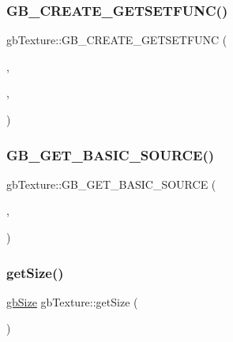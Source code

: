 \mbox{\label{classgb_texture_a0d3f3eb5103dc70d99d72483ce6aeea6}} 
\subsubsection{\texorpdfstring{GB\_CREATE\_GETSETFUNC()}{GB\_CREATE\_GETSETFUNC()}\hspace{0.1cm}{\footnotesize\ttfamily [3/3]}}
{\footnotesize\ttfamily gb\+Texture\+::\+G\+B\+\_\+\+C\+R\+E\+A\+T\+E\+\_\+\+G\+E\+T\+S\+E\+T\+F\+U\+NC (\begin{DoxyParamCaption}\item[{\mbox{\hyperlink{classgb_color}{gb\+Color}}}]{,  }\item[{Key\+Color}]{,  }\item[{key\+Color}]{ }\end{DoxyParamCaption})}

\mbox{\label{classgb_texture_ae20f0e9813df863f5a4a7b2a12330214}} 
\subsubsection{\texorpdfstring{GB\_GET\_BASIC\_SOURCE()}{GB\_GET\_BASIC\_SOURCE()}}
{\footnotesize\ttfamily gb\+Texture\+::\+G\+B\+\_\+\+G\+E\+T\+\_\+\+B\+A\+S\+I\+C\+\_\+\+S\+O\+U\+R\+CE (\begin{DoxyParamCaption}\item[{S\+D\+L\+\_\+\+Texture $\ast$}]{,  }\item[{texture}]{ }\end{DoxyParamCaption})}

\mbox{\label{classgb_texture_a3ecd2c1dfa7bf44db57883a85564f182}} 
\subsubsection{\texorpdfstring{getSize()}{getSize()}}
{\footnotesize\ttfamily \mbox{\hyperlink{classgb_size}{gb\+Size}} gb\+Texture\+::get\+Size (\begin{DoxyParamCaption}{ }\end{DoxyParamCaption})\hspace{0.3cm}{\ttfamily [inline]}}

